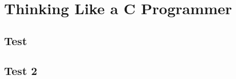 \documentclass[../main.tex]{subfiles}
\begin{document}
\chapter{Thinking Like a C Programmer}
\lipsum[1-5]
\section{Test}
\lipsum[1-5]
\section{Test 2}
\lipsum[1-5]
\end{document}
